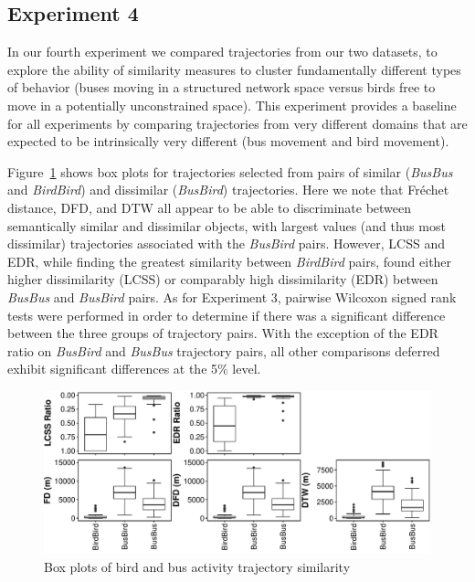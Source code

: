 \documentclass[10pt,letterpaper]{article}
\begin{document}
\subsection{Experiment 4}
\label{par:result_4}
In our fourth experiment we compared trajectories from our two datasets, to explore the ability of similarity measures to cluster fundamentally different types of behavior (buses moving in a structured network space versus birds free to move in a potentially unconstrained space). This experiment provides a baseline for all experiments by comparing trajectories from very different domains that are expected to be intrinsically very different (bus movement and bird movement). 

Figure~\ref{fig:BusBird} shows box plots for trajectories selected from pairs of similar (\textit{BusBus} and \textit{BirdBird}) and dissimilar (\textit{BusBird}) trajectories. Here we note that Fréchet distance, DFD, and DTW all appear to be able to discriminate between semantically similar and dissimilar objects, with largest values (and thus most dissimilar) trajectories associated with the \textit{BusBird} pairs. However, LCSS and EDR, while finding the greatest similarity between \textit{BirdBird} pairs, found either higher dissimilarity (LCSS) or  comparably high dissimilarity (EDR) between \textit{BusBus} and \textit{BusBird} pairs. As for Experiment 3, pairwise Wilcoxon signed rank tests were performed in order to determine if there was a significant difference between the three groups of trajectory pairs. With the exception of the EDR ratio on \textit{BusBird} and \textit{BusBus} trajectory pairs, all other comparisons  deferred exhibit significant differences at the 5\% level.

\begin{figure}[h]
	\includegraphics[width=\linewidth]{figures/Exp4}
	\caption{Box plots of bird and bus activity trajectory similarity} \label{fig:BusBird}
\end{figure}
\end{document}
